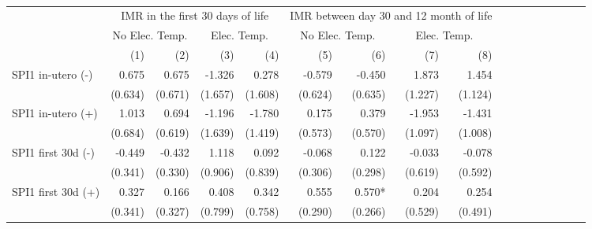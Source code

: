 \begin{table}[H]
\centering
\caption{}
\label{table6}
\begin{adjustbox}{max width=\linewidth}
\begin{tabular}{lrrrrrrrrrrrrrrrr}
\toprule
                                            &      \multicolumn{4}{c}{IMR in the first 30 days of life}     &   \multicolumn{4}{c}{IMR between day 30 and 12 month of life}      \\ 
\cmidrule(lr){2-5} \cmidrule(lr){6-9} \cmidrule(lr){10-13} \cmidrule(lr){14-17} 
                                            &      \multicolumn{2}{c}{No Elec. Temp.} &      \multicolumn{2}{c}{Elec. Temp.}     &  \multicolumn{2}{c}{No Elec. Temp.} &      \multicolumn{2}{c}{Elec. Temp.}      \\ 
\cmidrule(lr){2-5} \cmidrule(lr){6-9} \cmidrule(lr){10-13} \cmidrule(lr){14-17} 
                                            &        (1) &        (2) &        (3) &        (4) &       (5) &       (6) &       (7) &       (8)  \\ 
\midrule 
SPI1 in-utero  (-)                           &       0.675 &       0.675  &      -1.326 &       0.278 &       -0.579 &       -0.450 &        1.873 &        1.454 \\
                                             &     (0.634) &     (0.671)  &     (1.657) &     (1.608) &      (0.624) &      (0.635) &      (1.227) &      (1.124) \\
SPI1 in-utero  (+)                           &       1.013 &       0.694  &      -1.196 &      -1.780 &        0.175 &        0.379 &       -1.953 &       -1.431 \\
                                             &     (0.684) &     (0.619)  &     (1.639) &     (1.419) &      (0.573) &      (0.570) &      (1.097) &      (1.008) \\
SPI1 first 30d  (-)                          &      -0.449 &      -0.432  &       1.118 &       0.092 &       -0.068 &        0.122 &       -0.033 &       -0.078 \\
                                             &     (0.341) &     (0.330)  &     (0.906) &     (0.839) &      (0.306) &      (0.298) &      (0.619) &      (0.592) \\
SPI1 first 30d  (+)                          &       0.327 &       0.166  &       0.408 &       0.342 &        0.555 &       0.570* &        0.204 &        0.254 \\
                                             &     (0.341) &     (0.327)  &     (0.799) &     (0.758) &      (0.290) &      (0.266) &      (0.529) &      (0.491) \\

\end{tabular}
\end{adjustbox}
\end{table}
